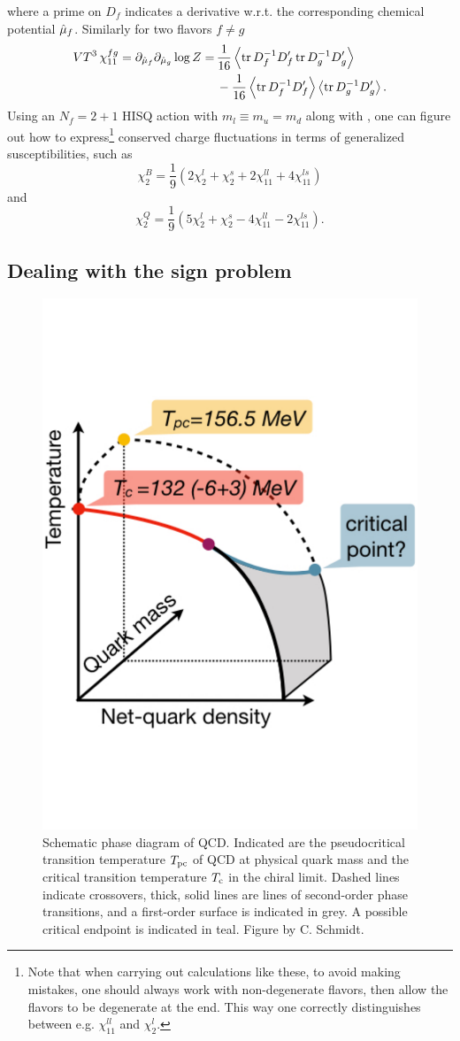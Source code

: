 where a prime on $D_f$ indicates a derivative w.r.t. the corresponding chemical
potential $\hat{\mu}_f$. Similarly for two flavors $f\neq g$ 
\begin{equation}\begin{aligned}
  VT^3\,\chi_{11}^{fg} =\partial_{\muh_f}\partial_{\muh_g}\log Z
                 = \,& \frac{1}{16}\ev{\tr D_f^{-1}D_f'\tr D_g^{-1}D_g'} \\
                   & -\frac{1}{16}\ev{\tr D_f^{-1}D_f'}\ev{\tr D_g^{-1}D_g'}.
\end{aligned}\end{equation}
Using an $N_f=2+1$ HISQ action with $m_l\equiv m_u=m_d$ along with 
, one can figure out how to 
express\footnote{Note that when carrying out calculations like these, to avoid making mistakes,
one should always work with non-degenerate flavors, then allow the flavors to be
degenerate at the end. This way one correctly distinguishes between e.g.
$\chi_{11}^{ll}$ and $\chi_2^l$.} conserved charge fluctuations in terms of 
generalized susceptibilities, such as
\begin{equation}
  \chi_2^B=\frac{1}{9}\left(2\chi_2^l+\chi_2^s+2\chi_{11}^{ll}+4\chi_{11}^{ls}\right)
\end{equation}
and
\begin{equation}
  \chi_2^Q=\frac{1}{9}\left(5\chi_2^l+\chi_2^s-4\chi_{11}^{ll}-2\chi_{11}^{ls}\right).
\end{equation}


\subsection{Dealing with the sign problem}

\begin{figure}
\centering
\vspace{-1cm}
\includegraphics[width=0.4\linewidth]{figs/3d_phase_diag_Gauss.003.pdf}
\vspace{-1cm}
\caption{Schematic phase diagram of QCD. Indicated are the pseudocritical transition temperature 
$T_{\rm pc}$ of QCD at physical quark mass and the critical transition temperature $T_{\rm c}$ in the 
chiral limit. Dashed lines indicate crossovers, thick, solid lines are lines of second-order phase 
transitions, and a first-order surface is indicated in grey. A possible critical endpoint 
is indicated in teal. Figure by C. Schmidt.}
\label{fig:pdiag}
\end{figure}

